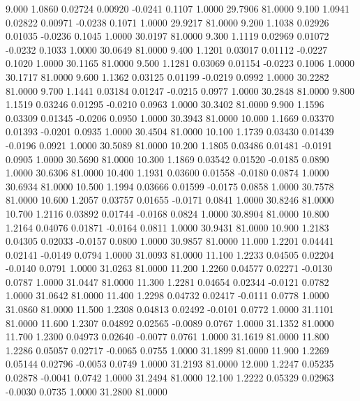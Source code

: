    9.000   1.0860   0.02724   0.00920  -0.0241   0.1107   1.0000  29.7906  81.0000
   9.100   1.0941   0.02822   0.00971  -0.0238   0.1071   1.0000  29.9217  81.0000
   9.200   1.1038   0.02926   0.01035  -0.0236   0.1045   1.0000  30.0197  81.0000
   9.300   1.1119   0.02969   0.01072  -0.0232   0.1033   1.0000  30.0649  81.0000
   9.400   1.1201   0.03017   0.01112  -0.0227   0.1020   1.0000  30.1165  81.0000
   9.500   1.1281   0.03069   0.01154  -0.0223   0.1006   1.0000  30.1717  81.0000
   9.600   1.1362   0.03125   0.01199  -0.0219   0.0992   1.0000  30.2282  81.0000
   9.700   1.1441   0.03184   0.01247  -0.0215   0.0977   1.0000  30.2848  81.0000
   9.800   1.1519   0.03246   0.01295  -0.0210   0.0963   1.0000  30.3402  81.0000
   9.900   1.1596   0.03309   0.01345  -0.0206   0.0950   1.0000  30.3943  81.0000
  10.000   1.1669   0.03370   0.01393  -0.0201   0.0935   1.0000  30.4504  81.0000
  10.100   1.1739   0.03430   0.01439  -0.0196   0.0921   1.0000  30.5089  81.0000
  10.200   1.1805   0.03486   0.01481  -0.0191   0.0905   1.0000  30.5690  81.0000
  10.300   1.1869   0.03542   0.01520  -0.0185   0.0890   1.0000  30.6306  81.0000
  10.400   1.1931   0.03600   0.01558  -0.0180   0.0874   1.0000  30.6934  81.0000
  10.500   1.1994   0.03666   0.01599  -0.0175   0.0858   1.0000  30.7578  81.0000
  10.600   1.2057   0.03757   0.01655  -0.0171   0.0841   1.0000  30.8246  81.0000
  10.700   1.2116   0.03892   0.01744  -0.0168   0.0824   1.0000  30.8904  81.0000
  10.800   1.2164   0.04076   0.01871  -0.0164   0.0811   1.0000  30.9431  81.0000
  10.900   1.2183   0.04305   0.02033  -0.0157   0.0800   1.0000  30.9857  81.0000
  11.000   1.2201   0.04441   0.02141  -0.0149   0.0794   1.0000  31.0093  81.0000
  11.100   1.2233   0.04505   0.02204  -0.0140   0.0791   1.0000  31.0263  81.0000
  11.200   1.2260   0.04577   0.02271  -0.0130   0.0787   1.0000  31.0447  81.0000
  11.300   1.2281   0.04654   0.02344  -0.0121   0.0782   1.0000  31.0642  81.0000
  11.400   1.2298   0.04732   0.02417  -0.0111   0.0778   1.0000  31.0860  81.0000
  11.500   1.2308   0.04813   0.02492  -0.0101   0.0772   1.0000  31.1101  81.0000
  11.600   1.2307   0.04892   0.02565  -0.0089   0.0767   1.0000  31.1352  81.0000
  11.700   1.2300   0.04973   0.02640  -0.0077   0.0761   1.0000  31.1619  81.0000
  11.800   1.2286   0.05057   0.02717  -0.0065   0.0755   1.0000  31.1899  81.0000
  11.900   1.2269   0.05144   0.02796  -0.0053   0.0749   1.0000  31.2193  81.0000
  12.000   1.2247   0.05235   0.02878  -0.0041   0.0742   1.0000  31.2494  81.0000
  12.100   1.2222   0.05329   0.02963  -0.0030   0.0735   1.0000  31.2800  81.0000
